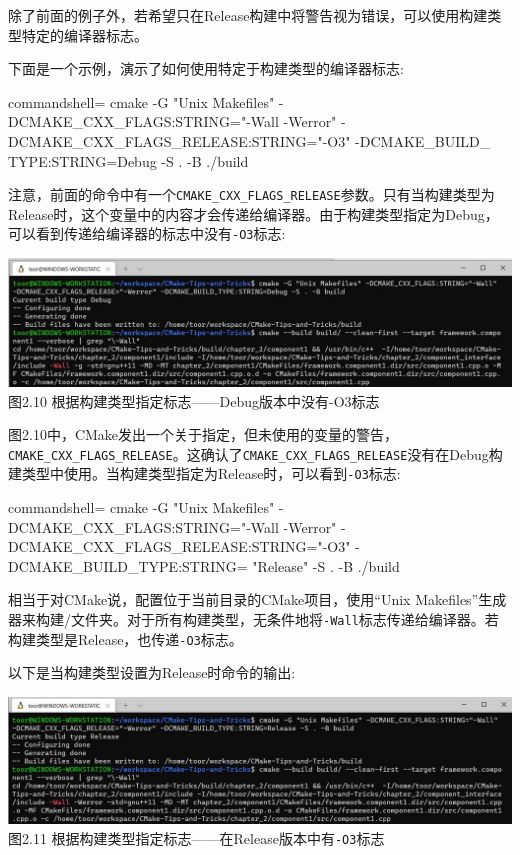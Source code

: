 除了前面的例子外，若希望只在Release构建中将警告视为错误，可以使用构建类型特定的编译器标志。

下面是一个示例，演示了如何使用特定于构建类型的编译器标志:

\begin{tcblisting}{commandshell={}}
cmake -G "Unix Makefiles" -DCMAKE_CXX_FLAGS:STRING="-Wall
  -Werror" -DCMAKE_CXX_FLAGS_RELEASE:STRING="-O3" -DCMAKE_BUILD_
  TYPE:STRING=Debug -S . -B ./build
\end{tcblisting}

注意，前面的命令中有一个\texttt{CMAKE\_CXX\_FLAGS\_RELEASE}参数。只有当构建类型为Release时，这个变量中的内容才会传递给编译器。由于构建类型指定为Debug，可以看到传递给编译器的标志中没有\texttt{-O3}标志:

\begin{center}
\includegraphics[width=1.\textwidth]{content/1/chapter2/images/10.jpg}\\
图2.10 根据构建类型指定标志——Debug版本中没有-O3标志
\end{center}

图2.10中，CMake发出一个关于指定，但未使用的变量的警告，\texttt{CMAKE\_CXX\_FLAGS\_RELEASE}。这确认了\texttt{CMAKE\_CXX\_FLAGS\_RELEASE}没有在Debug构建类型中使用。当构建类型指定为Release时，可以看到\texttt{-O3}标志:

\begin{tcblisting}{commandshell={}}
cmake -G "Unix Makefiles" -DCMAKE_CXX_FLAGS:STRING="-Wall
-Werror" -DCMAKE_CXX_FLAGS_RELEASE:STRING="-O3"
-DCMAKE_BUILD_TYPE:STRING= "Release" -S . -B ./build
\end{tcblisting}

相当于对CMake说，配置位于当前目录的CMake项目，使用“Unix Makefiles”生成器来构建/文件夹。对于所有构建类型，无条件地将\texttt{-Wall}标志传递给编译器。若构建类型是Release，也传递\texttt{-O3}标志。

以下是当构建类型设置为Release时命令的输出:

\begin{center}
\includegraphics[width=1.\textwidth]{content/1/chapter2/images/11.jpg}\\
图2.11 根据构建类型指定标志——在Release版本中有\texttt{-O3}标志
\end{center}

